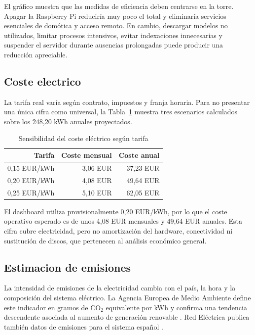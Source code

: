 El gráfico muestra que las medidas de eficiencia deben centrarse en la torre. Apagar la Raspberry Pi reduciría muy poco el total y eliminaría servicios esenciales de domótica y acceso remoto. En cambio, descargar modelos no utilizados, limitar procesos intensivos, evitar indexaciones innecesarias y suspender el servidor durante ausencias prolongadas puede producir una reducción apreciable.

\subsection{Coste electrico}
La tarifa real varía según contrato, impuestos y franja horaria. Para no presentar una única cifra como universal, la Tabla~\ref{tab:sensibilidad-coste} muestra tres escenarios calculados sobre los 248,20 kWh anuales proyectados.

\begin{table}[H]
  \centering
  \caption{Sensibilidad del coste eléctrico según tarifa}
  \label{tab:sensibilidad-coste}
  \begin{tabular}{rrr}
    \toprule
    Tarifa & Coste mensual & Coste anual \\
    \midrule
    0,15 EUR/kWh & 3,06 EUR & 37,23 EUR \\
    0,20 EUR/kWh & 4,08 EUR & 49,64 EUR \\
    0,25 EUR/kWh & 5,10 EUR & 62,05 EUR \\
    \bottomrule
  \end{tabular}
\end{table}

El dashboard utiliza provisionalmente 0,20 EUR/kWh, por lo que el coste operativo esperado es de unos 4,08 EUR mensuales y 49,64 EUR anuales. Esta cifra cubre electricidad, pero no amortización del hardware, conectividad ni sustitución de discos, que pertenecen al análisis económico general.

\subsection{Estimacion de emisiones}
La intensidad de emisiones de la electricidad cambia con el país, la hora y la composición del sistema eléctrico. La Agencia Europea de Medio Ambiente define este indicador en gramos de CO\(_2\) equivalente por kWh y confirma una tendencia descendente asociada al aumento de generación renovable \citep{eeaElectricityIntensity}. Red Eléctrica publica también datos de emisiones para el sistema español \citep{reeEmisionesElectricidad}.


